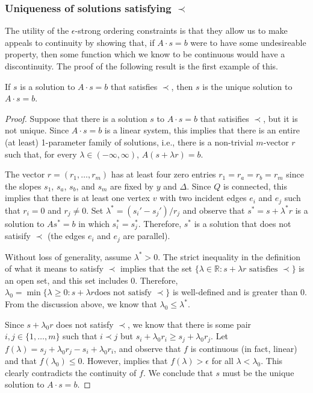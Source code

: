 \documentclass{patmorin}
\begin{document}
\subsubsection{Uniqueness of solutions satisfying $\prec$}

The utility of the $\epsilon$-strong ordering constraints is that they
allow us to make appeals to continuity by showing that, if $A\cdot s=b$
were to have some undesireable property, then some function which we
know to be continuous would have a discontinuity.  The proof of the 
following result is the first example of this.

\begin{lem}
   If $s$ is a solution to $A\cdot s=b$ that satisfies $\prec$, then $s$ is 
   the unique solution to $A\cdot s=b$.
\end{lem}

\begin{proof}
   Suppose that there is a solution $s$ to $A\cdot s=b$ that satisifies $\prec$,
   but it is not unique.  Since $A\cdot s=b$ is a linear system, this implies
   that there is an entire (at least) 1-parameter family of solutions,
   i.e., there is a non-trivial $m$-vector $r$ such that, for every
   $\lambda\in(-\infty,\infty)$, $A(s+\lambda r)=b$.

   The vector $r=(r_1,\ldots,r_m)$ has at least four zero entries
   $r_1=r_a=r_b=r_m$ since the slopes $s_1$, $s_a$, $s_b$, and $s_m$
   are fixed by $y$ and $\Delta$.  Since $Q$ is connected, this implies
   that there is at least one vertex $v$ with two incident edges $e_i$
   and $e_j$ such that $r_i=0$ and $r_j\neq 0$.  Set $\lambda^* =
   (s_i'-s_j')/r_j$ and observe that $s^*=s+\lambda^* r$ is a solution
   to $As^*=b$ in which $s_i^*=s_j^*$.  Therefore, $s^*$ is a solution that
   does not satisify $\prec$ (the edges $e_i$ and $e_j$
   are parallel).  

   Without loss of generality, assume $\lambda^* >0$. The strict
   inequality in the definition of what it means to satisfy $\prec$
   implies that the set $\{\lambda\in\mathbb{R}:\text{$s+\lambda
   r$ satisfies $\prec$}\}$ is an open set, and this set includes
   $0$. Therefore, $\lambda_0=\min\{\lambda \ge 0:\text{$s+\lambda r$
   does not satisfy $\prec$}\}$ is well-defined and is greater than 0.
   From the discussion above, we know that $\lambda_0\le \lambda^*$.

   Since $s+\lambda_0 r$ does not satisfy $\prec$, we know that
   there is some pair $i,j\in\{1,\ldots,m\}$ such that $i\prec j$
   but $s_i+\lambda_0 r_i \ge s_j+\lambda_0 r_j$. Let $f(\lambda)=
   s_j+\lambda_0 r_j - s_i+\lambda_0 r_i$, and observe that $f$ is
   continuous (in fact, linear) and that $f(\lambda_0)\le 0$.  However,
    implies that $f(\lambda)>\epsilon$ for all
   $\lambda <\lambda_0$. This clearly contradicts the continuity of $f$.
   We conclude that $s$ must be the unique solution to $A\cdot s=b$.
\end{proof}
\end{document}
